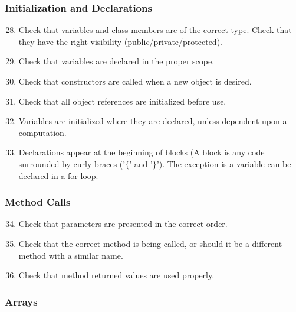 \subsubsection{Initialization and Declarations} \label{sssec:init}

\begin{enumerate}
\setcounter{enumi}{27}

\item Check that variables and class members are of the correct type. Check that they have the right visibility (public/private/protected).

\item Check that variables are declared in the proper scope.

\item Check that constructors are called when a new object is desired.

\item Check that all object references are initialized before use.

\item Variables are initialized where they are declared, unless dependent upon a computation.

\item Declarations appear at the beginning of blocks (A block is any code surrounded by curly braces ('$\{$' and '$\}$'). The exception is a variable can be declared in a for loop.

\end{enumerate}

\subsubsection{Method Calls} \label{sssec:calls}

\begin{enumerate}
\setcounter{enumi}{33}

\item Check that parameters are presented in the correct order.

\item Check that the correct method is being called, or should it be a different method with a similar name.

\item Check that method returned values are used properly.

\end{enumerate}

\subsubsection{Arrays} \label{sssec:arrays}

